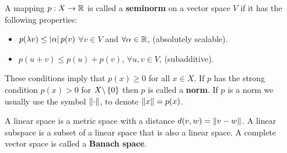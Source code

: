 \begin{definition}
A mapping $p: X \rightarrow \mathbb{R}$ is called a \textbf{seminorm} on a vector space $V$ if it has the following properties:
	\begin{itemize}
		\item $p(\lambda{v})\leq \left| \alpha \right|p(v)$ $\forall v \in V$ and $\forall \alpha \in \mathbb{R}$, (absolutely scalable).
		\item $p(u+v)\leq p(u)+p(v)$, $\forall u,v\in V$, (subadditive).
	\end{itemize}
These conditions imply that $p(x)\geq 0$ for all $x\in X$. If $p$ has the strong condition $p(x)>0$ for $X\backslash \left\lbrace 0 \right\rbrace$ then $p$ is called a \textbf{norm}. If $p$ is a norm we usually use the symbol $\left\|\cdot\right\|$, to denote $\left\|x\right\|=p(x)$.  
\end{definition}


A linear space is a metric space with a distance $d(v,w)=\left\|v-w\right\|$. A linear subspace is a subset of a linear space that is also a linear space. A complete vector space is called a \textbf{Banach space}.


